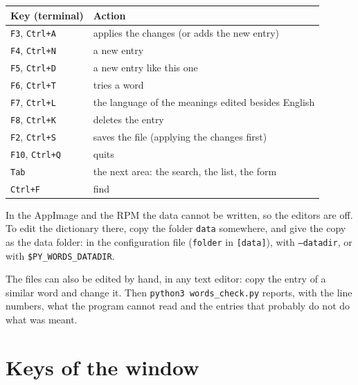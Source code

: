\documentclass[12pt,
              article,
              oneside
              ]{memoir}
\newcommand*{\key}[1]{\texttt{#1}}
\begin{document}
%
\begin{longtable}{@{}>{\raggedright}p{}p{}@{}}
\toprule
Key (terminal) & Action\\
\midrule
\endhead
\key{F3}, \key{Ctrl+A} & applies the changes (or adds the new entry)\\
\key{F4}, \key{Ctrl+N} & a new entry\\
\key{F5}, \key{Ctrl+D} & a new entry like this one\\
\key{F6}, \key{Ctrl+T} & tries a word\\
\key{F7}, \key{Ctrl+L} & the language of the meanings edited besides English\\
\key{F8}, \key{Ctrl+K} & deletes the entry\\
\key{F2}, \key{Ctrl+S} & saves the file (applying the changes first)\\
\key{F10}, \key{Ctrl+Q} & quits\\
\key{Tab} & the next area: the search, the list, the form\\
\key{Ctrl+F} & find\\
\bottomrule
\end{longtable}

\noindent{}%
In the AppImage and the RPM the data cannot be written, so the editors are
off. To edit the dictionary there, copy the folder \texttt{data} somewhere,
and give the copy as the data folder: in the configuration file
(\texttt{folder} in \texttt{[data]}), with \texttt{--datadir}, or with
\texttt{\$PY\_WORDS\_DATADIR}.

%
The files can also be edited by hand, in any text editor: copy the entry
of a similar word and change it. Then \texttt{python3 words\_check.py}
reports, with the line numbers, what the program cannot read and the
entries that probably do not do what was meant.

\section{Keys of the window}
\label{sec:keys}
\end{document}
